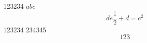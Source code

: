 
123234 $abc$
\begin{equation}
de\frac{1}{2} + d = c^2
\end{equation}
123234
234345
\begin{equation}
123
\end{equation}
